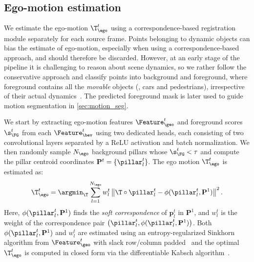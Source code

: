 
\subsection{Ego-motion estimation}
\label{sec:ego_motion}
We estimate the ego-motion $\T_\ego^t$ using a correspondence-based registration module separately for each source frame. Points belonging to dynamic objects can bias the estimate of ego-motion, especially when using a correspondence-based approach, and should therefore be discarded. 
However, at an early stage of the pipeline it is challenging to reason about scene dynamics, so we rather follow the conservative approach and classify points into background and foreground, where foreground contains all the \emph{movable} objects (\eg, cars and pedestrians), irrespective of their actual dynamics~\cite{gojcic2021weakly}. 
The predicted foreground mask is later used to guide motion segmentation in \cref{sec:motion_seg}.

We start by extracting ego-motion features $\Feature^t_\geo$ and foreground scores $\s^t_\FG$ from each $\Feature_\bev^t$ using two dedicated heads, each consisting of two convolutional layers separated by a ReLU activation and batch normalization. We then randomly sample $N_\ego$ background pillars whose $\s^t_\FG < \tau$ and compute the pillar centroid coordinates $\mathbf{P}^t = \{\pillar_l^t \}$. The ego motion $\T^t_\ego$ is estimated as:
\begin{equation}
{\T^t_\ego} = \argmin_{\T} \sum_{l=1}^{N_\ego} w_l^t \left\|\T \circ \pillar_l^t - \phi(\pillar_l^t, \mathbf{P}^1)\right\|^2. 
\label{eq: ego-motion}
\end{equation}
%
Here, $\phi(\pillar_l^t, \mathbf{P}^1)$ finds the \emph{soft correspondence} of $\mathbf{p}_l^t$ in $\mathbf{P}^1$, and $w_l^t$ is the weight of the correspondence pair $\big(\pillar_l^t, \phi(\pillar_l^t, \mathbf{P}^1)\big)$. Both $\phi(\pillar_l^t, \mathbf{P}^1)$ and $w_l^t$ are estimated using an entropy-regularized Sinkhorn algorithm from $\Feature_\geo^t$ with slack row/column padded~\cite{cuturi2013sinkhorn,yew2020rpm} and the optimal $\T^t_\ego$ is computed in closed form via the differentiable Kabsch algorithm~\cite{kabsch1976solution}.

